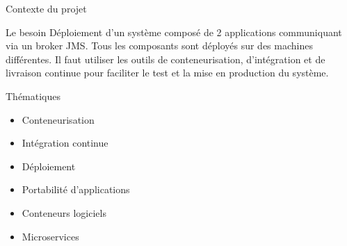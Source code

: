 \begin{frame}{Contexte du projet}
    \begin{block}{Le besoin}
        Déploiement d'un système composé de 2 applications communiquant via un broker JMS. Tous les composants sont déployés sur des machines différentes. Il faut utiliser les outils de conteneurisation, d'intégration et de livraison continue pour faciliter le test et la mise en production du système.
    \end{block}

    \begin{exampleblock}{Thématiques}
        \begin{multicols}{2}
            \begin{itemize}
                \item Conteneurisation
                \item Intégration continue
                \item Déploiement
                \item Portabilité d'applications
                \item Conteneurs logiciels
                \item Microservices
            \end{itemize}
        \end{multicols}
    \end{exampleblock}
\end{frame}
